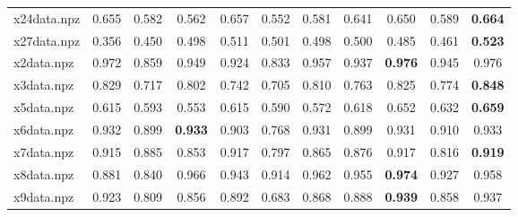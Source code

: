 \documentclass{article}
\begin{document}
\begin{table}[htbp]
\begin{adjustbox}{width=\textwidth}
\begin{tabular}{lcccccccccc}
x24data.npz & 0.655 & 0.582 & 0.562 & 0.657 & 0.552 & 0.581 & 0.641 & 0.650 & 0.589 & \cellcolor{graybg}\textbf{0.664} \\
x27data.npz & 0.356 & 0.450 & 0.498 & 0.511 & 0.501 & 0.498 & 0.500 & 0.485 & 0.461 & \cellcolor{graybg}\textbf{0.523} \\
x2data.npz & 0.972 & 0.859 & 0.949 & 0.924 & 0.833 & 0.957 & 0.937 & \cellcolor{graybg}\textbf{0.976} & 0.945 & 0.976 \\
x3data.npz & 0.829 & 0.717 & 0.802 & 0.742 & 0.705 & 0.810 & 0.763 & 0.825 & 0.774 & \cellcolor{graybg}\textbf{0.848} \\
x5data.npz & 0.615 & 0.593 & 0.553 & 0.615 & 0.590 & 0.572 & 0.618 & 0.652 & 0.632 & \cellcolor{graybg}\textbf{0.659} \\
x6data.npz & 0.932 & 0.899 & \cellcolor{graybg}\textbf{0.933} & 0.903 & 0.768 & 0.931 & 0.899 & 0.931 & 0.910 & 0.933 \\
x7data.npz & 0.915 & 0.885 & 0.853 & 0.917 & 0.797 & 0.865 & 0.876 & 0.917 & 0.816 & \cellcolor{graybg}\textbf{0.919} \\
x8data.npz & 0.881 & 0.840 & 0.966 & 0.943 & 0.914 & 0.962 & 0.955 & \cellcolor{graybg}\textbf{0.974} & 0.927 & 0.958 \\
x9data.npz & 0.923 & 0.809 & 0.856 & 0.892 & 0.683 & 0.868 & 0.888 & \cellcolor{graybg}\textbf{0.939} & 0.858 & 0.937 \\
\hline
\end{tabular}
\end{adjustbox}
\end{table}
\end{document}
